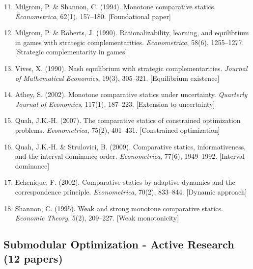 \begin{enumerate}
    \setcounter{enumi}{10}
    \item Milgrom, P. \& Shannon, C. (1994). Monotone comparative statics. \textit{Econometrica}, 62(1), 157--180. [Foundational paper]

    \item Milgrom, P. \& Roberts, J. (1990). Rationalizability, learning, and equilibrium in games with strategic complementarities. \textit{Econometrica}, 58(6), 1255--1277. [Strategic complementarity in games]

    \item Vives, X. (1990). Nash equilibrium with strategic complementarities. \textit{Journal of Mathematical Economics}, 19(3), 305--321. [Equilibrium existence]

    \item Athey, S. (2002). Monotone comparative statics under uncertainty. \textit{Quarterly Journal of Economics}, 117(1), 187--223. [Extension to uncertainty]

    \item Quah, J.K.-H. (2007). The comparative statics of constrained optimization problems. \textit{Econometrica}, 75(2), 401--431. [Constrained optimization]

    \item Quah, J.K.-H. \& Strulovici, B. (2009). Comparative statics, informativeness, and the interval dominance order. \textit{Econometrica}, 77(6), 1949--1992. [Interval dominance]

    \item Echenique, F. (2002). Comparative statics by adaptive dynamics and the correspondence principle. \textit{Econometrica}, 70(2), 833--844. [Dynamic approach]

    \item Shannon, C. (1995). Weak and strong monotone comparative statics. \textit{Economic Theory}, 5(2), 209--227. [Weak monotonicity]
\end{enumerate}

\subsection{Submodular Optimization - Active Research (12 papers)}

